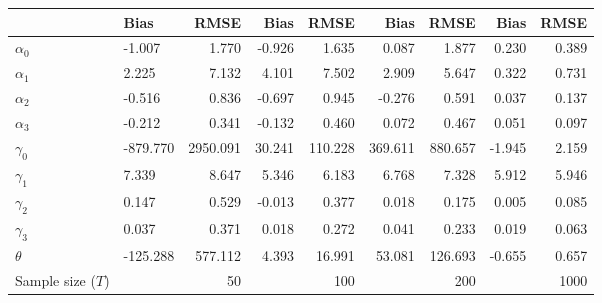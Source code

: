 
\begin{tabular}[t]{llrrrrrrr}
\toprule
  & Bias & RMSE & Bias & RMSE & Bias & RMSE & Bias & RMSE\\
\midrule
$\alpha_{0}$ & -1.007 & 1.770 & -0.926 & 1.635 & 0.087 & 1.877 & 0.230 & 0.389\\
$\alpha_{1}$ & 2.225 & 7.132 & 4.101 & 7.502 & 2.909 & 5.647 & 0.322 & 0.731\\
$\alpha_{2}$ & -0.516 & 0.836 & -0.697 & 0.945 & -0.276 & 0.591 & 0.037 & 0.137\\
$\alpha_{3}$ & -0.212 & 0.341 & -0.132 & 0.460 & 0.072 & 0.467 & 0.051 & 0.097\\
$\gamma_{0}$ & -879.770 & 2950.091 & 30.241 & 110.228 & 369.611 & 880.657 & -1.945 & 2.159\\
$\gamma_{1}$ & 7.339 & 8.647 & 5.346 & 6.183 & 6.768 & 7.328 & 5.912 & 5.946\\
$\gamma_{2}$ & 0.147 & 0.529 & -0.013 & 0.377 & 0.018 & 0.175 & 0.005 & 0.085\\
$\gamma_{3}$ & 0.037 & 0.371 & 0.018 & 0.272 & 0.041 & 0.233 & 0.019 & 0.063\\
$\theta$ & -125.288 & 577.112 & 4.393 & 16.991 & 53.081 & 126.693 & -0.655 & 0.657\\
Sample size ($T$) &  & 50 &  & 100 &  & 200 &  & 1000\\
\bottomrule
\end{tabular}
